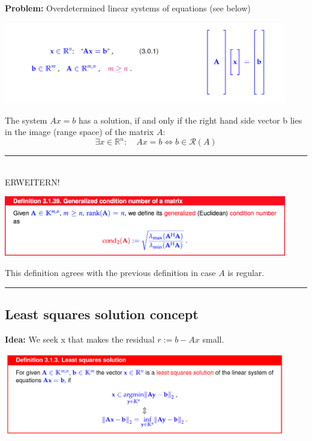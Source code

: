 \documentclass[12pt, a4paper]{article}
\newcommand{\R}{\mathbb{R}}
\begin{document}
\textbf{Problem:}  \quad Overdetermined linear systems of equations (see below)
\begin{center}
	\includegraphics[width=350pt]{leastsquares_overview.png}
\end{center}


The system $Ax=b$ has a solution, if and only if the right hand side vector b lies in the image (range space) of the matrix $A$:
\[
	\exists x \in \R^{n}: \quad Ax = b \Leftrightarrow b \in \mathcal{R}(A)
\]


\rule{40pt}{1pt} \\
ERWEITERN!
\begin{center}
	\includegraphics[width=350pt]{cond.png}
\end{center}

This definition agrees with the previous definition in case $A$ is regular. \\
\rule{40pt}{1pt}



\subsection{Least squares solution concept}

\textbf{Idea:} \quad We seek x that makes the residual $r:=b-Ax$ small.
\begin{center}
	\includegraphics[width=350pt]{leastsquares_solution.png}
\end{center}
\end{document}
